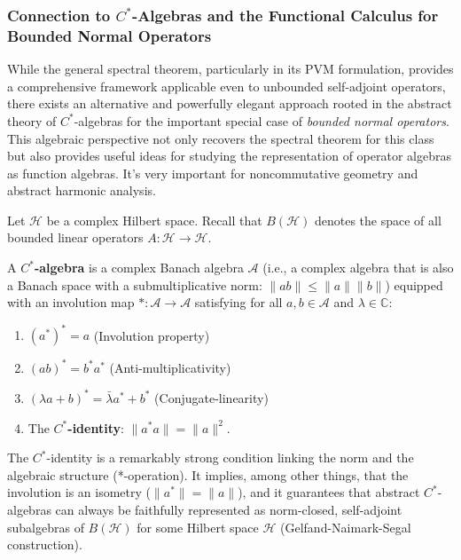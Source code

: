 \subsubsection{Connection to $C^*$-Algebras and the Functional Calculus for Bounded Normal Operators}
\label{subsec:cstar_expanded}

While the general spectral theorem, particularly in its PVM formulation, provides a comprehensive framework applicable even to unbounded self-adjoint operators, there exists an alternative and powerfully elegant approach rooted in the abstract theory of $C^*$-algebras for the important special case of \textit{bounded normal operators}. This algebraic perspective not only recovers the spectral theorem for this class but also provides useful ideas for studying the representation of operator algebras as function algebras. It's very important for noncommutative geometry and abstract harmonic analysis.

Let $\mathcal{H}$ be a complex Hilbert space. Recall that $B(\mathcal{H})$ denotes the space of all bounded linear operators $A: \mathcal{H} \to \mathcal{H}$.

\begin{definition}[$C^*$-Algebra]
A \textbf{$C^*$-algebra} is a complex Banach algebra $\mathcal{A}$ (i.e., a complex algebra that is also a Banach space with a submultiplicative norm: $\|ab\| \le \|a\|\|b\|$) equipped with an involution map $*: \mathcal{A} \to \mathcal{A}$ satisfying for all $a, b \in \mathcal{A}$ and $\lambda \in \mathbb{C}$:
\begin{enumerate}
    \item $(a^*)^* = a$ (Involution property)
    \item $(ab)^* = b^*a^*$ (Anti-multiplicativity)
    \item $(\lambda a + b)^* = \bar{\lambda} a^* + b^*$ (Conjugate-linearity)
    \item The \textbf{$C^*$-identity}: $\|a^*a\| = \|a\|^2$.
\end{enumerate}
\end{definition}

\begin{remark}
The $C^*$-identity is a remarkably strong condition linking the norm and the algebraic structure (*-operation). It implies, among other things, that the involution is an isometry ($\|a^*\| = \|a\|$), and it guarantees that abstract $C^*$-algebras can always be faithfully represented as norm-closed, self-adjoint subalgebras of $B(\mathcal{H})$ for some Hilbert space $\mathcal{H}$ (Gelfand-Naimark-Segal construction).
\end{remark}

